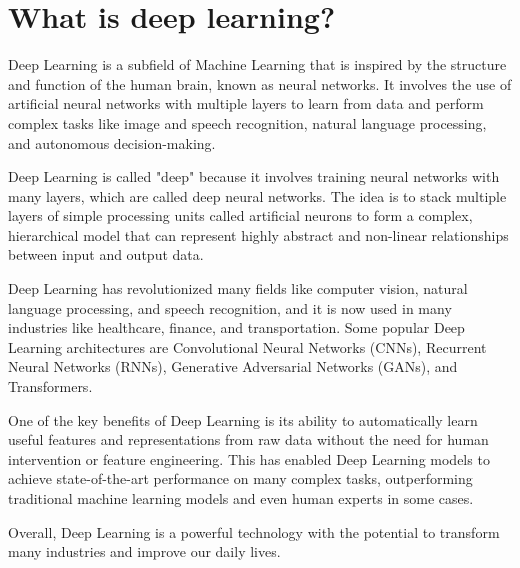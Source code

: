 \section{What is deep learning?}
Deep Learning is a subfield of Machine Learning that is inspired by the structure and function of the human brain, known as neural networks. It involves the use of artificial neural networks with multiple layers to learn from data and perform complex tasks like image and speech recognition, natural language processing, and autonomous decision-making.

Deep Learning is called "deep" because it involves training neural networks with many layers, which are called deep neural networks. The idea is to stack multiple layers of simple processing units called artificial neurons to form a complex, hierarchical model that can represent highly abstract and non-linear relationships between input and output data.

Deep Learning has revolutionized many fields like computer vision, natural language processing, and speech recognition, and it is now used in many industries like healthcare, finance, and transportation. Some popular Deep Learning architectures are Convolutional Neural Networks (CNNs), Recurrent Neural Networks (RNNs), Generative Adversarial Networks (GANs), and Transformers.

One of the key benefits of Deep Learning is its ability to automatically learn useful features and representations from raw data without the need for human intervention or feature engineering. This has enabled Deep Learning models to achieve state-of-the-art performance on many complex tasks, outperforming traditional machine learning models and even human experts in some cases.

Overall, Deep Learning is a powerful technology with the potential to transform many industries and improve our daily lives.

